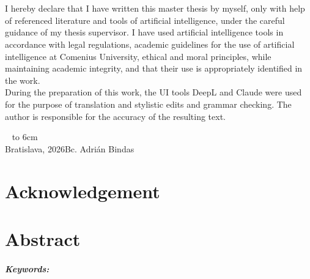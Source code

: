 \documentclass[12pt, oneside]{book}  %
\def\mfauthor{Bc. Adrián Bindas}
\def\mfplacedate{Bratislava, 2026}
\begin{document}
\cleardoublepage


{~}\vspace{12cm}

\noindent
\begin{minipage}{0.25\textwidth}~\end{minipage}
\begin{minipage}{0.75\textwidth}
I hereby declare that I have written this master thesis by myself, only with help of referenced literature and tools of artificial intelligence, under the careful guidance of my thesis supervisor.
I have used artificial intelligence tools in accordance with legal regulations, academic guidelines for the use of artificial intelligence at Comenius University, ethical and moral principles, while maintaining academic integrity, and that their use is appropriately identified in the work.\\
During the preparation of this work, the UI tools DeepL and Claude were used for the purpose of translation and stylistic edits and grammar checking. The author is responsible for the accuracy of the resulting text.
\newline \newline
\end{minipage}
\vfill
~ \hfill {\hbox to 6cm{\dotfill}} \\
\mfplacedate \hfill \mfauthor

\thispagestyle{empty}
\newpage




\chapter*{Acknowledgement}\label{chap:thank_you}


\thispagestyle{empty}
\newpage 


\chapter*{Abstract}\label{chap:abstract_en}


\paragraph*{Keywords: }  
\end{document}
